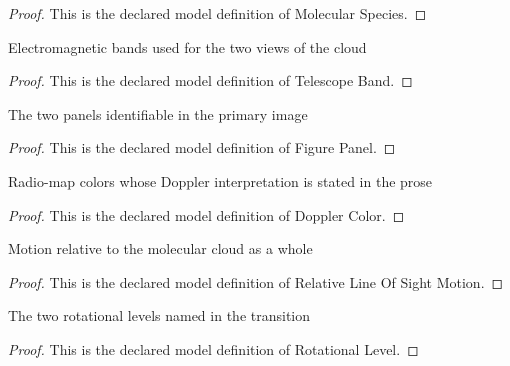 \begin{proof}
  This is the declared model definition of Molecular Species.
\end{proof}
\begin{definition}
  \label{def:physics:phyx-mini-0628:phyxminiproblems-problemphyxmini0628-telescopeband}
  Electromagnetic bands used for the two views of the cloud
\end{definition}
\begin{proof}
  This is the declared model definition of Telescope Band.
\end{proof}
\begin{definition}
  \label{def:physics:phyx-mini-0628:phyxminiproblems-problemphyxmini0628-figurepanel}
  The two panels identifiable in the primary image
\end{definition}
\begin{proof}
  This is the declared model definition of Figure Panel.
\end{proof}
\begin{definition}
  \label{def:physics:phyx-mini-0628:phyxminiproblems-problemphyxmini0628-dopplercolor}
  Radio-map colors whose Doppler interpretation is stated in the prose
\end{definition}
\begin{proof}
  This is the declared model definition of Doppler Color.
\end{proof}
\begin{definition}
  \label{def:physics:phyx-mini-0628:phyxminiproblems-problemphyxmini0628-relativelineofsightmotion}
  Motion relative to the molecular cloud as a whole
\end{definition}
\begin{proof}
  This is the declared model definition of Relative Line Of Sight Motion.
\end{proof}
\begin{definition}
  \label{def:physics:phyx-mini-0628:phyxminiproblems-problemphyxmini0628-rotationallevel}
  The two rotational levels named in the transition
\end{definition}
\begin{proof}
  This is the declared model definition of Rotational Level.
\end{proof}
